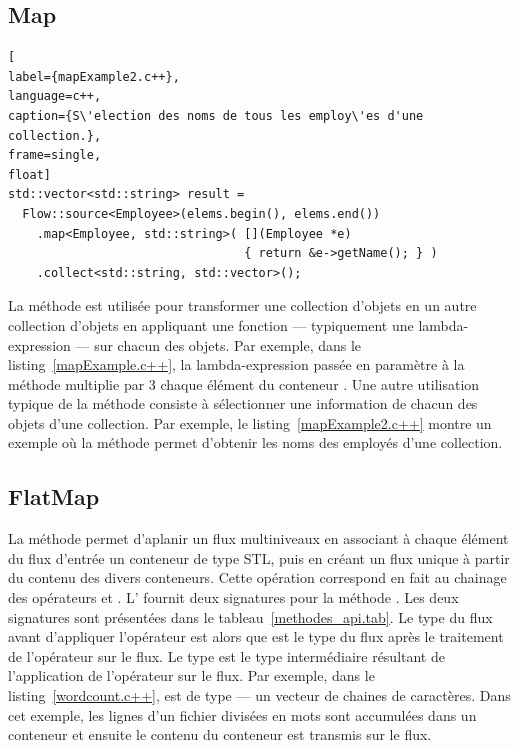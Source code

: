 \subsection{Map}




\begin{lstlisting}[
label={mapExample2.c++},
language=c++,
caption={S\'election des noms de tous les employ\'es d'une collection.},
frame=single,
float]
std::vector<std::string> result =
  Flow::source<Employee>(elems.begin(), elems.end())
    .map<Employee, std::string>( [](Employee *e) 
                                 { return &e->getName(); } )
    .collect<std::string, std::vector>();
\end{lstlisting}


La m\'ethode  est utilis\'ee pour transformer une collection d'objets en un autre collection d'objets en appliquant une fonction --- typiquement une lambda-expression --- sur chacun des objets. Par exemple, dans le listing~\ref{mapExample.c++}, la lambda-expression pass\'ee en param\`etre \`a la m\'ethode  multiplie par 3 chaque \'el\'ement du conteneur . Une autre utilisation typique de la méthode  consiste \`a s\'electionner une information de chacun des objets d'une collection. Par exemple, le listing~\ref{mapExample2.c++} montre un exemple o\`u la méthode  permet d'obtenir les noms des employ\'es d'une collection. 


\subsection{FlatMap}

La m\'ethode   permet d'aplanir un flux multiniveaux en associant \`a chaque \'el\'ement du flux d'entr\'ee un conteneur de type STL, puis en cr\'eant un flux unique \`a partir du contenu des divers conteneurs. Cette op\'eration correspond en fait au chainage des op\'erateurs  et . L' fournit deux signatures pour la m\'ethode . Les deux signatures sont pr\'esent\'ees dans le tableau~\ref{methodes_api.tab}. Le type du flux avant d'appliquer l'op\'erateur  est  alors que  est le type du flux apr\`es le traitement de l'op\'erateur sur le flux. Le type  est le type interm\'ediaire r\'esultant de l'application de l'op\'erateur  sur le flux. Par exemple, dans le listing~\ref{wordcount.c++},  est de type  --- un vecteur de chaines de caract\`eres. Dans cet exemple, les lignes d'un fichier divis\'ees en mots sont accumul\'ees dans un conteneur et ensuite le contenu du conteneur est transmis sur le flux.


